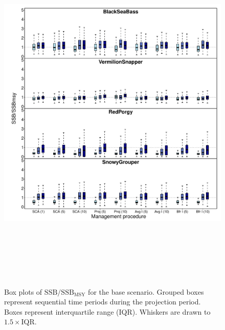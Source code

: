 \documentclass[12pt,english]{article}
\begin{document}
\begin{figure}[!ht]
\begin{center}
\includegraphics[width=6in, height=7in]{../Figs/boxplotSBSBMSY1.pdf}
\end{center}
\begin{flushleft}
\caption{Box plots of $\mathrm{SSB/SSB_{MSY}}$ for the base scenario. Grouped boxes represent sequential time periods during the projection period. Boxes represent interquartile range (IQR). Whiskers are drawn to $1.5\times\mathrm{IQR}$.}
\label{fig:boxplotSBSBMSY1}
\end{flushleft}
\end{figure}
\end{document}
